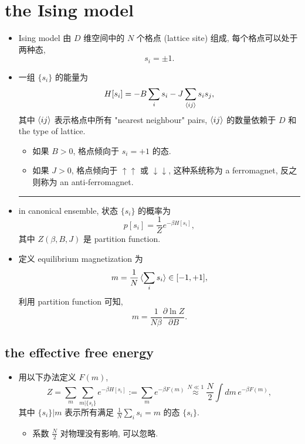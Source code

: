 \chapter{the Ising model}
\begin{itemize}
	\item Ising model 由 $D$ 维空间中的 $N$ 个格点 (lattice site) 组成, 每个格点可以处于两种态,
	\begin{equation}
		s_i = \pm 1.
	\end{equation}
	
	\item 一组 $\{s_i\}$ 的能量为
	\begin{equation}
		H[s_i] = - B \sum_i s_i - J \sum_{\braket{i j}} s_i s_j,
	\end{equation}
	其中 $\braket{i j}$ 表示格点中所有 "nearest neighbour" pairs, $\braket{i j}$ 的数量依赖于 $D$ 和 the type of lattice.
	\begin{itemize}
		\item 如果 $B > 0$, 格点倾向于 $s_i = + 1$ 的态.
		
		\item 如果 $J > 0$, 格点倾向于 $\uparrow \uparrow$ 或 $\downarrow \downarrow$, 这种系统称为 a ferromagnet, 反之则称为 an anti-ferromagnet.
	\end{itemize}
	
	\noindent\rule[0.5ex]{\linewidth}{0.5pt} %
	
	\item in canonical ensemble, 状态 $\{s_i\}$ 的概率为
	\begin{equation}
		p[s_i] = \frac{1}{Z} e^{- \beta H[s_i]},
	\end{equation}
	其中 $Z(\beta, B, J)$ 是 partition function.
	
	\item 定义 equilibrium magnetization 为
	\begin{equation}
		m = \frac{1}{N} \braket{\sum_i s_i} \in [- 1, + 1],
	\end{equation}
	利用 partition function 可知,
	\begin{equation}
		m = \frac{1}{N \beta} \frac{\partial \ln Z}{\partial B}.
	\end{equation}
\end{itemize}

\section{the effective free energy}
\begin{itemize}
	\item 用以下办法定义 $F(m)$,
	\begin{equation}
		Z = \sum_m \sum_{m | \{s_i\}} e^{- \beta H[s_i]} := \sum_m e^{- \beta F(m)} \overset{N \ll 1}{\approx} \frac{N}{2} \int dm \, e^{- \beta F(m)},
	\end{equation}
	其中 $\{s_i\} | m$ 表示所有满足 $\frac{1}{N} \sum_i s_i = m$ 的态 $\{s_i\}$.
	\begin{itemize}
		\item 系数 $\frac{N}{2}$ 对物理没有影响, 可以忽略.
	\end{itemize}
\end{itemize}

